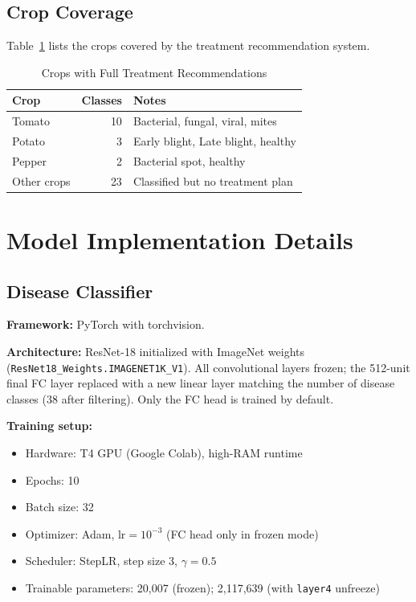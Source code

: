 \documentclass[conference]{IEEEtran}
\let\oldtexttt\texttt
\renewcommand{\texttt}[1]{{\small\oldtexttt{#1}}}
\begin{document}
\subsection{Crop Coverage}

Table~\ref{tab:crops} lists the crops covered by the treatment recommendation system.

\begin{table}[h!]
\caption{Crops with Full Treatment Recommendations}
\label{tab:crops}
\centering
\renewcommand{\arraystretch}{1.2}
\begin{tabular}{@{}lrl@{}}
\toprule
\textbf{Crop} & \textbf{Classes} & \textbf{Notes} \\
\midrule
Tomato  & 10 & Bacterial, fungal, viral, mites \\
Potato  & 3  & Early blight, Late blight, healthy \\
Pepper  & 2  & Bacterial spot, healthy \\
\midrule
Other crops & 23 & Classified but no treatment plan \\
\bottomrule
\end{tabular}
\end{table}

\section{Model Implementation Details}

\subsection{Disease Classifier}

\textbf{Framework:} PyTorch with torchvision.

\textbf{Architecture:} ResNet-18 initialized with ImageNet weights (\texttt{ResNet18\_Weights.IMAGENET1K\_V1}). All convolutional layers frozen; the 512-unit final FC layer replaced with a new linear layer matching the number of disease classes (38 after filtering). Only the FC head is trained by default.

\textbf{Training setup:}
\begin{itemize}
  \item Hardware: T4 GPU (Google Colab), high-RAM runtime
  \item Epochs: 10
  \item Batch size: 32
  \item Optimizer: Adam, $\text{lr} = 10^{-3}$ (FC head only in frozen mode)
  \item Scheduler: StepLR, step size 3, $\gamma = 0.5$
  \item Trainable parameters: 20,007 (frozen); 2,117,639 (with \texttt{layer4} unfreeze)
\end{itemize}
\end{document}
